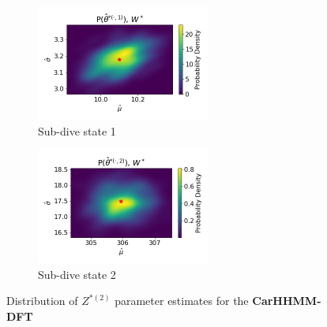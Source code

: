 \documentclass[12pt]{TD-CJS}
\begin{document}
\begin{figure}[ht]
	\centering
	\begin{subfigure}[t]{0.45\textwidth}
        \centering
        \includegraphics[width=2.25in]{../Plots/hhmm_FV_MLE_density_FoVeDBA_0_0.png}
        \caption{Sub-dive state 1}
    \end{subfigure}
    \begin{subfigure}[t]{0.45\textwidth}
        \centering
        \includegraphics[width=2.25in]{../Plots/hhmm_FV_MLE_density_FoVeDBA_0_1.png}
        \caption{Sub-dive state 2}
    \end{subfigure}
    \caption{Distribution of $Z^{*(2)}$ parameter estimates for the \textbf{CarHHMM-DFT}}
\end{figure}

\end{document}

